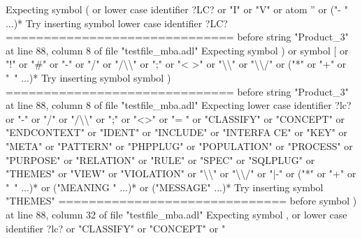 {  Expecting symbol ( or lower case identifier ?LC? or "I" or "V" or atom '' or ("-\newline
  " ...)*\newline
  Try inserting symbol lower case identifier ?LC?\newline
  \newline
  ==============================\newline
  \newline
  before string "Product\_3" at line 88, column 8 of file "testfile\_mba.adl"\newline
  Expecting symbol ) or symbol [ or "!" or "\#" or "-" or "/" or "/\textbackslash{}\textbackslash{}" or ";" or "<\newline
  >" or "\textbackslash{}\textbackslash{}" or "\textbackslash{}\textbackslash{}/" or ("*" or "+" or "~" ...)*\newline
  Try inserting symbol symbol )\newline
  \newline
  ==============================\newline
  \newline
  before string "Product\_3" at line 88, column 8 of file "testfile\_mba.adl"\newline
  Expecting lower case identifier ?lc? or "-" or "/" or "/\textbackslash{}\textbackslash{}" or ";" or "<>" or "=\newline
  " or "CLASSIFY" or "CONCEPT" or "ENDCONTEXT" or "IDENT" or "INCLUDE" or "INTERFA\newline
  CE" or "KEY" or "META" or "PATTERN" or "PHPPLUG" or "POPULATION" or "PROCESS" or\newline
   "PURPOSE" or "RELATION" or "RULE" or "SPEC" or "SQLPLUG" or "THEMES" or "VIEW"\newline
  or "VIOLATION" or "\textbackslash{}\textbackslash{}" or "\textbackslash{}\textbackslash{}/" or "|-" or ("*" or "+" or "~" ...)* or ("MEANING\newline
  " ...)* or ("MESSAGE" ...)*\newline
  Try inserting symbol "THEMES"\newline
  \newline
  ==============================\newline
  \newline
  before symbol ) at line 88, column 32 of file "testfile\_mba.adl"\newline
  Expecting symbol , or lower case identifier ?lc? or "CLASSIFY" or "CONCEPT" or "\newline
}
